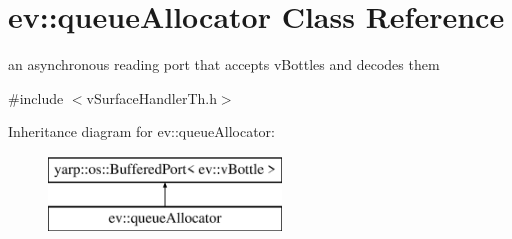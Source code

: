 \hypertarget{classev_1_1queueAllocator}{}\section{ev\+:\+:queue\+Allocator Class Reference}
\label{classev_1_1queueAllocator}


an asynchronous reading port that accepts v\+Bottles and decodes them  




{\ttfamily \#include $<$v\+Surface\+Handler\+Th.\+h$>$}

Inheritance diagram for ev\+:\+:queue\+Allocator\+:\begin{figure}[H]
\begin{center}
\leavevmode
\includegraphics[height=2.000000cm]{classev_1_1queueAllocator}
\end{center}
\end{figure}
